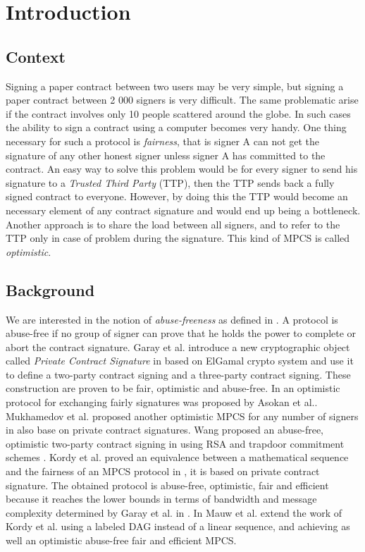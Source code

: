 \section{Introduction}

\subsection{Context}
Signing a paper contract between two users may be very simple, but signing a paper contract between 2 000 signers is very difficult. The same problematic arise if the contract involves only 10 people scattered around the globe. In such cases the ability to sign a contract using a computer becomes very handy. One thing necessary for such a protocol is \textit{fairness}, that is signer A can not get the signature of any other honest signer unless signer A has committed to the contract. An easy way to solve this problem would be for every signer to send his signature to a \textit{Trusted Third Party} (TTP), then the TTP sends back a fully signed contract to everyone. However, by doing this the TTP would become an necessary element of any contract signature and would end up being a bottleneck. Another approach is to share the load between all signers, and to refer to the TTP only in case of problem during the signature. This kind of MPCS is called \textit{optimistic}.

\subsection{Background}
We are interested in the notion of \textit{abuse-freeness} as defined in \cite{Promise}. A protocol is abuse-free if no group of signer can prove that he holds the power to complete or abort the contract signature. Garay et al. introduce a new cryptographic object called \textit{Private Contract Signature} in \cite{Promise} based on ElGamal crypto system \cite{Elgamal} and use it to define a two-party contract signing and a three-party contract signing. These construction are proven to be fair, optimistic and abuse-free. In \cite{asokan} an optimistic protocol for exchanging fairly signatures was proposed by Asokan et al..  Mukhamedov et al. proposed another optimistic MPCS for any number of signers in \cite{muka} also base on private contract signatures. Wang proposed an abuse-free, optimistic two-party contract signing in \cite{wang-rsa} using RSA and trapdoor commitment schemes \cite{tcs}. Kordy et al. proved an equivalence between a mathematical sequence and the fairness of an MPCS protocol in \cite{Original}, it is based on private contract signature. The obtained protocol is abuse-free, optimistic, fair and efficient because it reaches the lower bounds in terms of bandwidth and message complexity determined by Garay et al. in \cite{bounds}. In \cite{DAG-MPCS} Mauw et al. extend the work of Kordy et al. using a labeled DAG instead of a linear sequence, and achieving as well an optimistic abuse-free fair and efficient MPCS.

